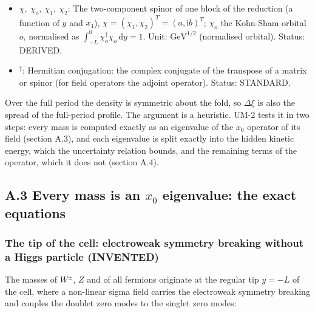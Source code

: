 \documentclass[
  10pt,
]{article}
\begin{document}
\begin{itemize}
  (\(fL = 8.926\times10^{-21}\) m at the stabilised block). Status:
  ASSUMED.
\item
  \(\chi,\ \chi_o,\ \chi_1,\ \chi_2\): The two-component spinor of one
  block of the reduction (a function of \(y\) and \(x_4\)),
  \(\chi = (\chi_1, \chi_2)^T = (a, \mathrm{i}b)^T\); \(\chi_o\) the
  Kohn-Sham orbital \(o\), normalised as
  \(\int_{-L}^{0}\chi_o^\dagger\chi_o\,\mathrm{d}y = 1\). Unit:
  \(\mathrm{GeV}^{1/2}\) (normalised orbital). Status: DERIVED.
\item
  \({}^\dagger\): Hermitian conjugation: the complex conjugate of the
  transpose of a matrix or spinor (for field operators the adjoint
  operator). Status: STANDARD.
\end{itemize}

Over the full period the density is symmetric about the fold, so
\(\Delta\xi\) is also the spread of the full-period profile. The
argument is a heuristic. UM-2 tests it in two steps: every mass is
computed exactly as an eigenvalue of the \(x_0\) operator of its field
(section A.3), and each eigenvalue is split exactly into the hidden
kinetic energy, which the uncertainty relation bounds, and the remaining
terms of the operator, which it does not (section A.4).

\hypertarget{a.3-every-mass-is-an-x_0-eigenvalue-the-exact-equations}{%
\subsection*{\texorpdfstring{A.3 Every mass is an \(x_0\) eigenvalue:
the exact
equations}{A.3 Every mass is an x\_0 eigenvalue: the exact equations}}\label{a.3-every-mass-is-an-x_0-eigenvalue-the-exact-equations}}

\hypertarget{the-tip-of-the-cell-electroweak-symmetry-breaking-without-a-higgs-particle-invented}{%
\subsubsection*{The tip of the cell: electroweak symmetry breaking
without a Higgs particle
(INVENTED)}\label{the-tip-of-the-cell-electroweak-symmetry-breaking-without-a-higgs-particle-invented}}

The masses of \(W^\pm\), \(Z\) and of all fermions originate at the
regular tip \(y = -L\) of the cell, where a non-linear sigma field
carries the electroweak symmetry breaking and couples the doublet zero
modes to the singlet zero modes:
\end{document}
